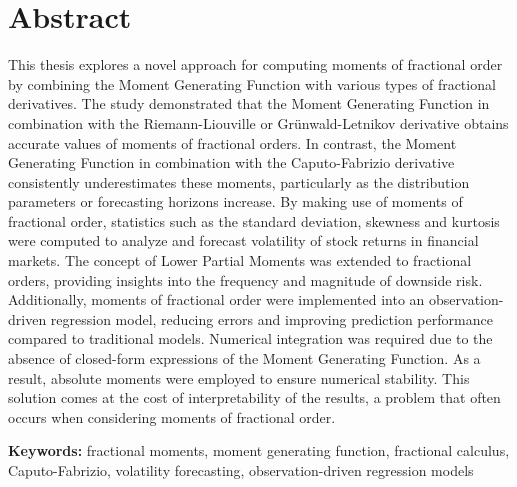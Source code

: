 \section*{Abstract}
This thesis explores a novel approach for computing moments of fractional order by combining the Moment Generating Function with various types of fractional derivatives. The study demonstrated that the Moment Generating Function in combination with the Riemann-Liouville or Grünwald-Letnikov derivative obtains accurate values of moments of fractional orders. In contrast, the Moment Generating Function in combination with the Caputo-Fabrizio derivative consistently underestimates these moments, particularly as the distribution parameters or forecasting horizons increase.
By making use of moments of fractional order, statistics such as the standard deviation, skewness and kurtosis were computed to analyze and forecast volatility of stock returns in financial markets.
The concept of Lower Partial Moments was extended to fractional orders, providing insights into the frequency and magnitude of downside risk. Additionally, moments of fractional order were implemented into an observation-driven regression model, reducing errors and improving prediction performance compared to traditional models. Numerical integration was required due to the absence of closed-form expressions of the Moment Generating Function. As a result, absolute moments were employed to ensure numerical stability. This solution comes at the cost of interpretability of the results, a problem that often occurs when considering moments of fractional order.

\bigskip\noindent
\textbf{Keywords:} fractional moments, moment generating function, fractional calculus, Caputo-Fabrizio, volatility forecasting, observation-driven regression models